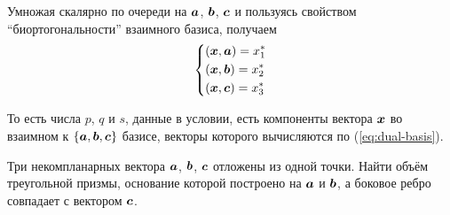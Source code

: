 \documentclass[a4paper,12pt]{article}
\begin{document}
\begin{solution}
    Умножая скалярно по очереди на $\boldsymbol a$, $\boldsymbol b$, $\boldsymbol c$ и пользуясь свойством ``биортогональности'' взаимного базиса, получаем
    \[
      \left\{
        \begin{aligned}
          &(\boldsymbol x, \boldsymbol a) = x_1^*\\
          &(\boldsymbol x, \boldsymbol b) = x_2^*\\
          &(\boldsymbol x, \boldsymbol c) = x_3^*
        \end{aligned}
      \right.
    \]
    
    То есть числа $p$, $q$ и $s$, данные в условии, есть компоненты вектора $\boldsymbol x$ во взаимном к $\{\boldsymbol a, \boldsymbol b, \boldsymbol c\}$ базисе, векторы которого вычисляются по (\ref{eq:dual-basis}).
  \end{solution}
  
  
  
  \begin{problem}[3.22(1)]
    Три некомпланарных вектора $\boldsymbol a$, $\boldsymbol b$, $\boldsymbol c$ отложены из одной точки.
    Найти объём треугольной призмы, основание которой построено на $\boldsymbol a$ и $\boldsymbol b$, а боковое ребро совпадает с вектором $\boldsymbol c$.
  \end{problem}
  
\end{document}
